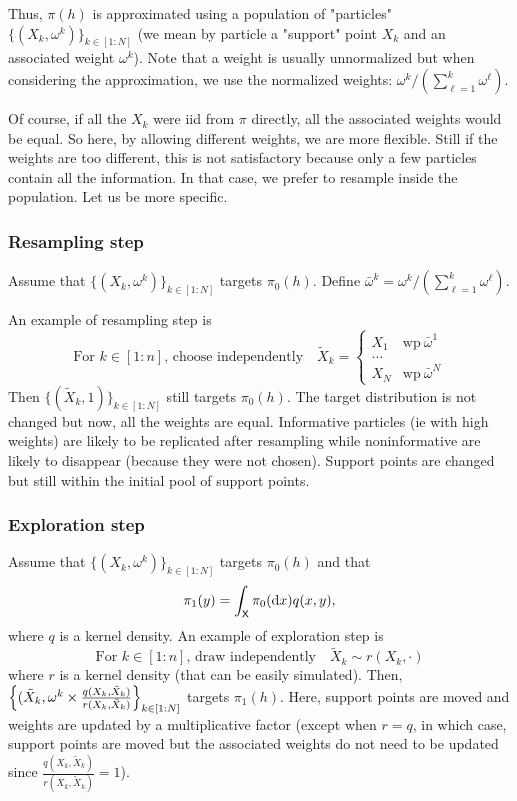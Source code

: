\documentclass[english,graybox,envcountchap,envcountsame,sectrefs,shortlabels]{svmono}
\theoremstyle{style}
\newcommand{\eqsp}{}
\begin{document}
Thus, $\pi(h)$ is approximated using a population of "particles" $\{(X_k,\omega^k)\}_{k\in[1:N]}$ (we mean by particle a "support" point $X_k$ and an associated weight $\omega^k$). Note that a weight is usually unnormalized but when considering the approximation, we use the normalized weights: $\omega^k/(\sum_{\ell=1}^{k} \omega^\ell)$.

Of course, if all the $X_k$ were iid from $\pi$ directly, all the associated weights would be equal. So here, by allowing different weights, we are more flexible. Still if the weights are too different, this is not satisfactory because only a few particles contain all the information. In that case, we prefer to resample inside the population. Let us be more specific.

\subsubsection{Resampling step}
Assume that $\{(X_k,\omega^k)\}_{k\in[1:N]}$ targets $\pi_0(h)$. Define $\bar \omega^k=\omega^k/(\sum_{\ell=1}^{k} \omega^\ell)$.

An example of resampling step is
$$
\mbox{For $k\in[1:n]$, choose independently}\quad \tilde X_k=\begin{cases}
X_1& \mbox{wp} \ \bar \omega^1\\
\ldots&\\
X_N & \mbox{wp} \ \bar \omega^N
\end{cases}
$$
Then $\{(\tilde X_k,1)\}_{k\in[1:N]}$ still targets $\pi_0(h)$. The target distribution is not changed but now, all the weights are equal. Informative particles (ie with high weights) are likely to be replicated after resampling while noninformative are likely to disappear (because they were not chosen). Support points are changed but still within the initial pool of support points.

\subsubsection{Exploration step}
Assume that $\{(X_k,\omega^k)\}_{k\in[1:N]}$ targets $\pi_0(h)$ and that
\begin{equation} \label{eq:explor}
\pi_1(y)=\int_\Xset \pi_0(\rmd x) q(x,y)\eqsp,
\end{equation}
where $q$ is a kernel density. An example of exploration step is
$$
\mbox{For $k\in[1:n]$, draw independently}\quad \tilde X_k\sim r(X_k,\cdot)
$$
where $r$ is a kernel density (that can be easily simulated).
Then, $\left\{ (\tilde X_k,\omega^k \times \frac{q(X_k,\tilde X_k)}{r(X_k,\tilde X_k)}\right\}_{k\in[1:N]}$ targets $\pi_1(h)$.
Here, support points are moved and weights are updated by a multiplicative factor (except when $r=q$, in which case, support points are moved but the associated weights do not need to be updated  since $ \frac{q(X_k,\tilde X_k)}{r(X_k,\tilde X_k)}=1$).
\end{document}
